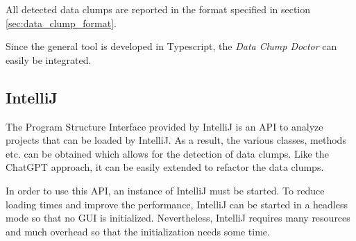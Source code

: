 All detected data clumps are reported in the format specified in section \ref{sec:data_clump_format}.

Since the general tool is developed in Typescript, the \textit{Data Clump Doctor} can easily be integrated.

\begin{comment}
\subsection{ChatGPT}
ChatGPT is another approach to detect data clumps as it can process code easily and report data clumps in any format the user wants. It also supports many programming languages that other tools do not provide.

However, ChatGPT has a limited context size, so that processing large projects is  either too costly or simply not possible.

Additionally, giving ChatGPT the right instructions to find data clumps can be challenging. While ChatGPT can define and find some data clumps without further context, it is better to give it a precise definition to work with. The following definition leads to good result, however it cannot be guaranteed that this will work forever:


A data clump exists
\begin{enumerate}
   
   \item if at least three fields also exists in another class
   \item if at least three fields also exists as method parameters in some method
    \item if two methods have at least three common parameters
\end{enumerate}
\end{comment}

\subsection{IntelliJ}
The Program Structure Interface provided by IntelliJ is an \ac{API} to analyze projects that can be loaded by IntelliJ. As a result, the various classes, methods etc. can be obtained which allows for the detection of data clumps. Like the ChatGPT approach, it can be easily extended to refactor the data clumps.

In order to use this API, an instance of IntelliJ must be started. To reduce loading times and improve the performance, IntelliJ can be started in a headless mode so that no GUI is initialized. Nevertheless, IntelliJ requires many resources and much overhead so that  the initialization  needs some time.

